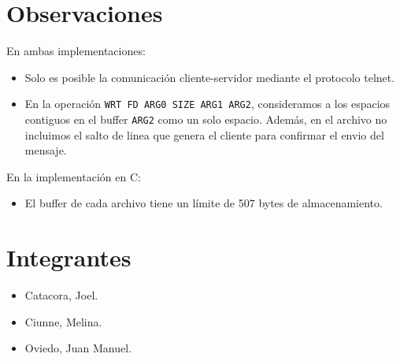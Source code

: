 \documentclass[a4paper, 8pt]{article}
\begin{document}
\section{Observaciones}

En ambas implementaciones:

\begin{itemize}

% 

  \item Solo es posible la comunicación cliente-servidor mediante el protocolo telnet.
  
  \item En la operación \texttt{WRT FD ARG0 SIZE ARG1 ARG2}, consideramos a los espacios contiguos en el buffer \texttt{ARG2}
  como un solo espacio. Además, en el archivo no incluimos el salto de linea que genera el cliente para confirmar el envio del mensaje.
  
\end{itemize}

En la implementación en C:

\begin{itemize}
  \item El buffer de cada archivo tiene un límite de 507 bytes de almacenamiento.
  
\end{itemize}

\section{Integrantes}
\begin{itemize}
  \item Catacora, Joel.
  \item Ciunne, Melina.
  \item Oviedo, Juan Manuel.
\end{itemize}
\end{document}
